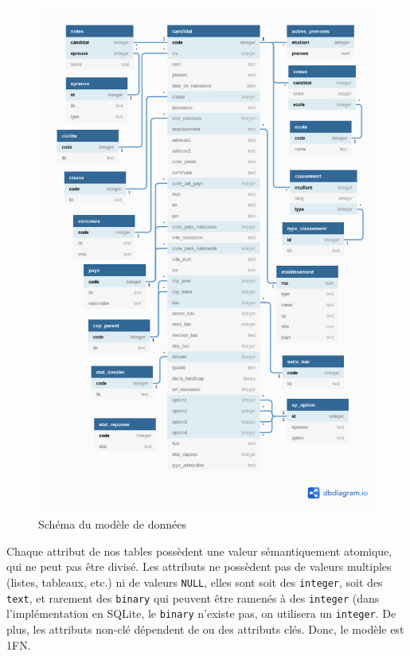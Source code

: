 \documentclass[12pt]{article}
\begin{document}
            \begin{figure}[!h]
                \centering
                \includegraphics[scale = 0.49]{Images/Etat de l'art/schema_db.png}
                \caption{Schéma du modèle de données}
                \label{fig:bd}
            \end{figure}
            
            
        \newpage
        Chaque attribut de nos tables possèdent une valeur sémantiquement atomique, qui ne peut pas être divisé. Les attributs ne possèdent pas de valeurs multiples (listes, tableaux, etc.) ni de valeurs \texttt{NULL}, elles sont soit des \texttt{integer}, soit des \texttt{text}, et rarement des \texttt{binary} qui peuvent être ramenés à des \texttt{integer} (dans l'implémentation en \textsf{SQLite}, le \texttt{binary} n'existe pas, on utilisera un \texttt{integer}. De plus, les attributs non-clé dépendent de ou des attributs clés. Donc, le modèle est 1FN.
        
\end{document}
